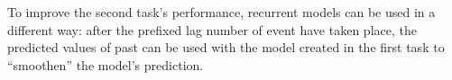 To improve the second task's performance, recurrent models can be used in a different way: after the prefixed lag number of event have taken place, the predicted values of past can be used with the model created in the first task to ``smoothen'' the model's prediction.




\newpage





